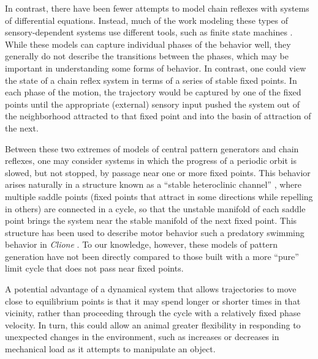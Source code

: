 In contrast, there have been fewer attempts to model chain reflexes with
systems of differential equations.  Instead, much of the work modeling
these types of sensory-dependent systems use different tools, such as
finite state machines \citep{lewinger_sensory_2006}.  While these models can capture individual phases of the behavior well,
they generally do not describe the transitions between the phases, which may
be important in understanding some forms of behavior.  In contrast, one could
view the state of a chain reflex system in terms of a series of stable fixed
points.  In each phase of the motion,
the trajectory would be captured by one of the fixed points until the
appropriate (external) sensory input pushed the system out of the neighborhood
attracted to that fixed point and into the basin of attraction of the next.

Between these two extremes of models of central pattern generators and chain
reflexes, one may consider systems in which the progress of a periodic orbit is
slowed, but not stopped, by passage near one or more fixed points.  This
behavior arises naturally in a structure known as a ``stable heteroclinic channel''
\citep{rabinovich_transient_2008}, where multiple saddle points (fixed points
that attract in some directions while repelling in others) are connected in a
cycle, so that the unstable manifold of each saddle point brings
the system near the stable manifold of the next fixed point.  This structure has been used
to describe motor behavior such a predatory swimming behavior in
\textit{Clione} \citep{levi_dual_2004,varona_competing_2004}.
  To our
knowledge, however, these models of pattern generation have not been directly
compared to those built with a more ``pure'' limit cycle that does not pass near
fixed points.

A potential advantage of a dynamical system that allows trajectories to move close
to equilibrium points is that it may spend longer or shorter times in that vicinity,
rather than proceeding through the cycle with a relatively fixed phase velocity.
In turn, this could allow an animal greater flexibility in responding to unexpected
changes in the environment, such as increases or decreases in mechanical load as it
attempts to manipulate an object.

